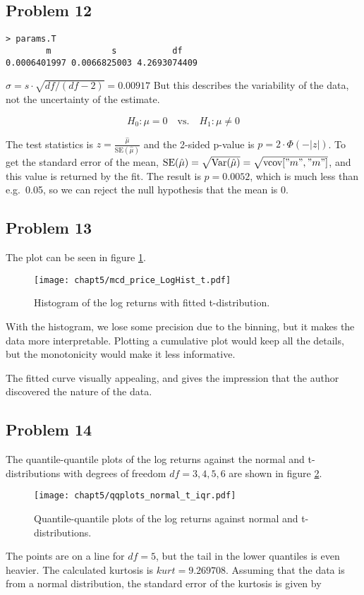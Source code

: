 \documentclass{article}
\begin{document}
\subsection{Problem 12}
\begin{verbatim}
> params.T 
        m            s           df 
0.0006401997 0.0066825003 4.2693074409
\end{verbatim}
$\sigma = s \cdot \sqrt{df / (df - 2)} = 0.00917$
But this describes the variability of the data, not the uncertainty of the estimate.

$$H_0: \mu = 0 \quad \text{vs.} \quad H_1: \mu \ne 0$$

The test statistics is $z = \frac{ \hat{\mu} }{ \text{SE}(\hat{\mu}) }$
and the 2-sided p-value is $p = 2 \cdot \Phi(-|z|)$.
To get the standard error of the mean,
$\text{SE}(\hat{\mu}) = \sqrt{ \operatorname{Var}(\hat{\mu}) } = \sqrt{ \text{vcov}["m", "m"] }$,
and this value is returned by the fit. The result is $p = 0.0052$,
which is much less than e.g.\ 0.05, so we can reject the null hypothesis that the mean is 0.
\subsection{Problem 13}
The plot can be seen in figure \ref{fig:mcd_price_LogHist_t}.
\begin{figure}[ht]
    \centering
    \texttt{[image: chapt5/mcd\_price\_LogHist\_t.pdf]}
    \caption{Histogram of the log returns with fitted t-distribution.}
    \label{fig:mcd_price_LogHist_t}
\end{figure}
With the histogram, we lose some precision due to the binning, but it makes the data more interpretable.
Plotting a cumulative plot would keep all the details, but the monotonicity would make it less informative.

The fitted curve visually appealing,
and gives the impression that the author discovered the nature of the data.
\subsection{Problem 14}
The quantile-quantile plots of the log returns against the normal and t-distributions
with degrees of freedom $df=3, 4, 5, 6$ are shown in figure \ref{fig:qqplots_normal_t_iqr}.
\begin{figure}[ht]
    \centering
    \texttt{[image: chapt5/qqplots\_normal\_t\_iqr.pdf]}
    \caption{Quantile-quantile plots of the log returns against normal and t-distributions.}
    \label{fig:qqplots_normal_t_iqr}
\end{figure}
The points are on a line for $df=5$, but the tail in the lower quantiles is even heavier.
The calculated kurtosis is $kurt=9.269708$. Assuming that the data is from a normal distribution,
the standard error of the kurtosis is given by
\end{document}
